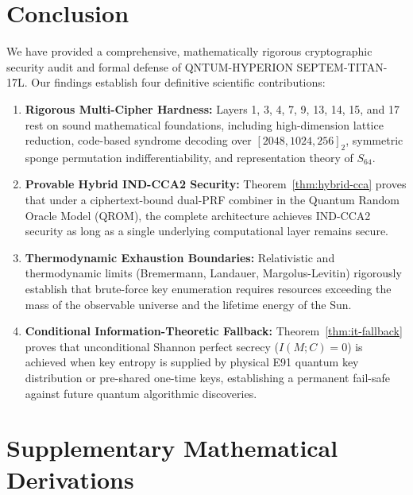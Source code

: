 \documentclass{ieeeaccess}
\begin{document}
\section{Conclusion}
\label{sec:conclusion}

We have provided a comprehensive, mathematically rigorous cryptographic security audit and formal defense of \textsc{QNTUM-HYPERION SEPTEM-TITAN-17L}.
Our findings establish four definitive scientific contributions:
\begin{enumerate}
  \item \textbf{Rigorous Multi-Cipher Hardness:} Layers 1, 3, 4, 7, 9, 13, 14, 15, and 17 rest on sound mathematical foundations, including high-dimension lattice reduction, code-based syndrome decoding over $[2048, 1024, 256]_2$, symmetric sponge permutation indifferentiability, and representation theory of $S_{64}$.
  \item \textbf{Provable Hybrid IND-CCA2 Security:} Theorem~\ref{thm:hybrid-cca} proves that under a ciphertext-bound dual-PRF combiner in the Quantum Random Oracle Model (QROM), the complete architecture achieves IND-CCA2 security as long as a single underlying computational layer remains secure.
  \item \textbf{Thermodynamic Exhaustion Boundaries:} Relativistic and thermodynamic limits (Bremermann, Landauer, Margolus-Levitin) rigorously establish that brute-force key enumeration requires resources exceeding the mass of the observable universe and the lifetime energy of the Sun.
  \item \textbf{Conditional Information-Theoretic Fallback:} Theorem~\ref{thm:it-fallback} proves that unconditional Shannon perfect secrecy ($I(M; C)=0$) is achieved when key entropy is supplied by physical E91 quantum key distribution or pre-shared one-time keys, establishing a permanent fail-safe against future quantum algorithmic discoveries.
\end{enumerate}

\appendices
\section{Supplementary Mathematical Derivations}
\label{sec:appendix}
\end{document}
